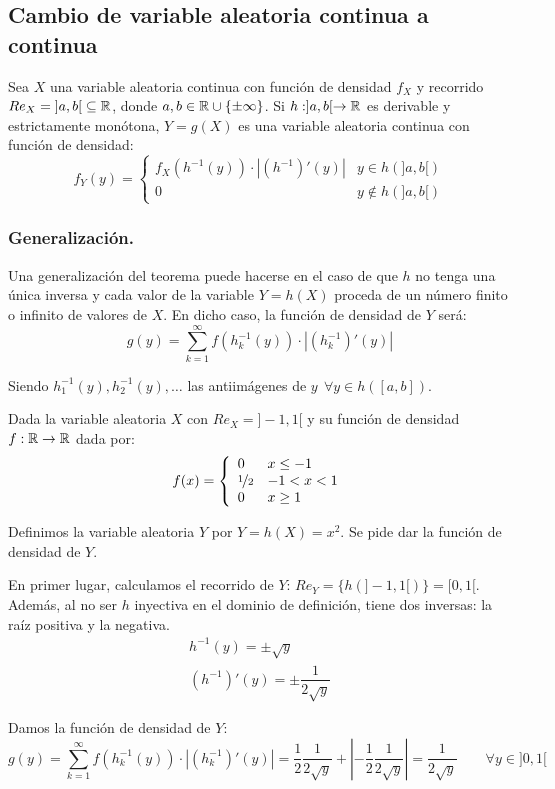 \subsection{Cambio de variable aleatoria continua a continua}
\label{subsec:CV_Continua}

\begin{coro}
    Sea $X$ una variable aleatoria continua con función de densidad $f_X$ y recorrido $Re_X=\left]a,b\right[\subseteq \mathbb R$, donde $a,b\in \mathbb{R}\cup \{\pm \infty\}$.
    Si $h:]a,b[\to \mathbb{R}$ es derivable y estrictamente monótona, $Y=g(X)$ es una variable aleatoria continua con función de densidad:
    \begin{equation*}
        f_Y(y)=\begin{cases}
            f_X(h^{-1}(y))\cdot |(h^{-1})'(y)| & y \in h(]a,b[)\\
            0 & y \notin h(]a,b[)
        \end{cases}
    \end{equation*}
\end{coro}
\subsubsection{Generalización.}
Una generalización del teorema puede hacerse en el caso de que $h$ no tenga una única inversa y cada valor de la variable $Y=h(X)$ proceda de un número finito o infinito de valores de $X$. En dicho caso, la función de densidad de $Y$ será:
$$g(y) = \sum_{k=1}^{\infty} f(h^{-1}_k(y)) \cdot |(h^{-1}_k)'(y)|$$

Siendo $h_1^{-1}(y),h_2^{-1}(y), \ldots$ las antiimágenes de $y~~\forall y \in h([a,b])$.

\begin{ejemplo}
    Dada la variable aleatoria $X$ con $Re_X=]-1, 1[$ y su función de densidad $f:\mathbb R \rightarrow \mathbb R$ dada por:
    $$f(x) = \left\{ \begin{array}{ll}
        0           & x \leq -1  \\
        \nicefrac{1}{2} & -1 < x < 1 \\
        0           & x \geq 1
    \end{array} \right. $$
    
    Definimos la variable aleatoria $Y$ por $Y=h(X) =x^2$. Se pide dar la función de densidad de $Y$.
    
    En primer lugar, calculamos el recorrido de $Y$: $Re_Y=\{h(]-1,1[)\} = [0,1[$. Además, al no ser $h$ inyectiva en el dominio de definición, tiene dos inversas: la raíz positiva y la negativa.
    \begin{gather*}
        h^{-1}(y) = \pm \sqrt{y}\\
        (h^{-1})'(y) = \pm \dfrac{1}{2\sqrt{y}}
    \end{gather*}
    
    Damos la función de densidad de $Y$:
    $$g(y) = \sum_{k=1}^{\infty} f(h^{-1}_k(y)) \cdot |(h^{-1}_k)'(y)|
    =  \dfrac{1}{2} \dfrac{1}{2\sqrt{y}} + \left|-\dfrac{1}{2} \dfrac{1}{2\sqrt{y}}\right|
    =  \dfrac{1}{2\sqrt{y}} \qquad \forall y \in ]0,1[$$
\end{ejemplo}

